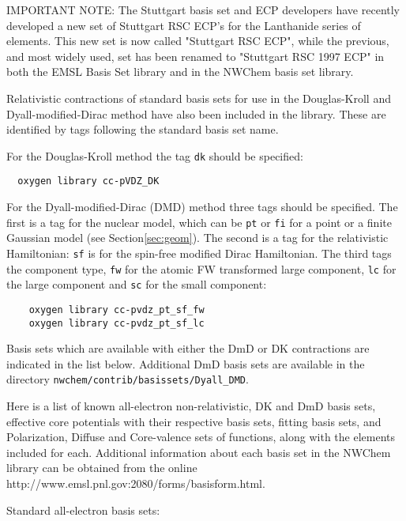 IMPORTANT NOTE:
The Stuttgart basis set and ECP developers have recently developed a new set of 
Stuttgart RSC ECP's for the Lanthanide series of elements. This new set is 
now called "Stuttgart RSC ECP", while the previous, and most widely used, 
set has been renamed to "Stuttgart RSC 1997 ECP" in both the EMSL Basis Set 
library and in the NWChem basis set library. 

Relativistic contractions of standard basis sets for use in the Douglas-Kroll 
and Dyall-modified-Dirac method have also been included in the library. These
are identified by tags following the standard basis set name.  \newline

For the Douglas-Kroll method the tag \verb+dk+ should be specified: 

\begin{verbatim}
  oxygen library cc-pVDZ_DK
\end{verbatim}

For the Dyall-modified-Dirac (DMD) method three tags should be specified. The 
first is a tag for the nuclear model, which can be \verb+pt+ or \verb+fi+ for 
a point or a finite Gaussian model (see Section\ref{sec:geom}).  The second 
is a tag for the relativistic Hamiltonian: \verb+sf+ is for the spin-free 
modified Dirac Hamiltonian. The third tags the component type, \verb+fw+ for 
the atomic FW transformed large component, \verb+lc+ for the large component 
and \verb+sc+ for the small component: 
\begin{verbatim}
    oxygen library cc-pvdz_pt_sf_fw
    oxygen library cc-pvdz_pt_sf_lc
\end{verbatim} 
Basis sets which are available with either the DmD or DK contractions are
indicated in the list below. Additional DmD basis sets are available in the
directory \verb#nwchem/contrib/basissets/Dyall_DMD#.

\sloppy
Here is a list of known all-electron non-relativistic, DK and DmD basis sets, 
effective core potentials with their respective basis sets, fitting basis sets, 
and Polarization, Diffuse and Core-valence sets of functions,
along with the elements included for each. Additional information about each 
basis set in the NWChem library can be obtained from the online 
{http://www.emsl.pnl.gov:2080/forms/basisform.html}.

Standard all-electron basis sets:

